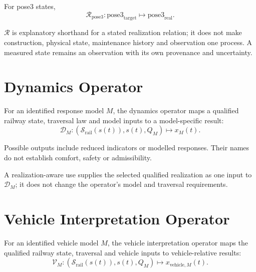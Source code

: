 For pose3 states,
\[
\mathcal R_{\mathrm{pose3}}:
\mathrm{pose3}_{\mathrm{target}}
\mapsto
\mathrm{pose3}_{\mathrm{real}}.
\]

\(\mathcal R\) is explanatory shorthand for a stated realization relation; it
does not make construction, physical state, maintenance history and
observation one process. A measured state remains an observation with its own
provenance and uncertainty.

\section{Dynamics Operator}

\begin{definition}
\label{def:runtime-dynamics-operator-operator-chapter}
For an identified response model \(M\), the dynamics operator maps a qualified
railway state, traversal law and model inputs to a model-specific result:
\[
\mathcal D_M :
(\mathcal S_{\mathrm{rail}}(s(t)),s(t),Q_M)
\mapsto
x_M(t).
\]
\end{definition}

Possible outputs include reduced indicators or modelled responses. Their names
do not establish comfort, safety or admissibility.

A realization-aware use supplies the selected qualified realization as one
input to \(\mathcal D_M\); it does not change the operator's model and
traversal requirements.

\section{Vehicle Interpretation Operator}

\begin{definition}
\label{def:runtime-vehicle-operator}
For an identified vehicle model \(M\), the vehicle interpretation operator
maps the qualified railway state, traversal and vehicle inputs to
vehicle-relative results:
\[
\mathcal V_M :
\left(\mathcal S_{\mathrm{rail}}(s(t)),s(t),Q_M\right)
\mapsto
x_{\mathrm{vehicle},M}(t).
\]
\end{definition}

